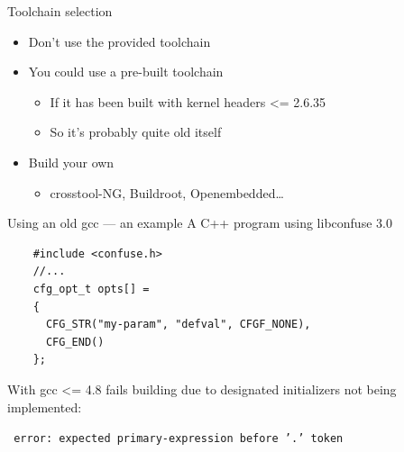 \documentclass[xetex,table,aspectratio=169]{beamer}
\begin{document}
\begin{frame}{Toolchain selection}
  \begin{itemize}
  \item Don't use the provided toolchain
  \item You could use a pre-built toolchain
    \begin{itemize}
    \item If it has been built with kernel headers <= 2.6.35
    \item So it's probably quite old itself
    \end{itemize}
  \item Build your own
    \begin{itemize}
    \item crosstool-NG, Buildroot, Openembedded\dots
    \end{itemize}
  \end{itemize}
\end{frame}

\begin{frame}[fragile]{Using an old gcc --- an example}
  A C++ program using libconfuse 3.0

  \begin{verbatim}
    #include <confuse.h>
    //...
    cfg_opt_t opts[] =
    {
      CFG_STR("my-param", "defval", CFGF_NONE),
      CFG_END()
    };
  \end{verbatim}

  With gcc <= 4.8 fails building due to designated initializers not being implemented:

  \texttt{ error: expected primary-expression before '.' token}
\end{frame}
\end{document}
